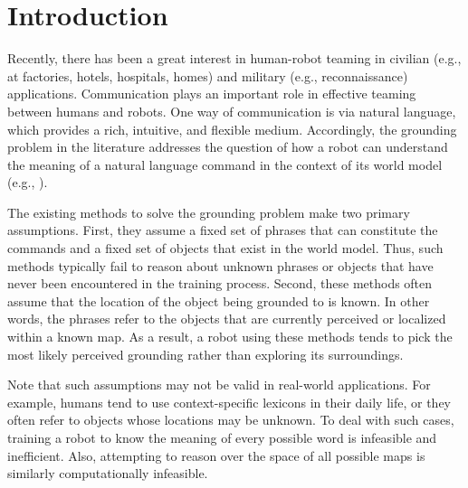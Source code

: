 \section{Introduction}
Recently, there has been a great interest in human-robot teaming in civilian (e.g., at factories, hotels, hospitals, homes) and military (e.g., reconnaissance) applications. Communication plays an important role in effective teaming between humans and robots. One way of communication is via natural language, which provides a rich, intuitive, and flexible medium. Accordingly, the grounding problem in the literature addresses the question of how a robot can understand the meaning of a natural language command in the context of its world model (e.g., \cite{g3,dcg,adcg2016}). 

The existing methods to solve the grounding problem make two primary assumptions. First, they assume a fixed set of phrases that can constitute the commands and a fixed set of objects that exist in the world model. Thus, such methods typically fail to reason about unknown phrases or objects that have never been encountered in the training process.
Second, these methods often assume that the location of the object being grounded to is known. In other words, the phrases refer to the objects that are currently perceived or localized within a known map.
As a result, a robot using these methods tends to pick the most likely perceived grounding rather than exploring its surroundings.

Note that such assumptions may not be valid in real-world applications. For example, humans tend to use context-specific lexicons in their daily life, or they often refer to objects whose locations may be unknown. To deal with such cases, training a robot to know the meaning of every possible word is infeasible and inefficient. Also, attempting to reason over the space of all possible maps is similarly computationally infeasible.

